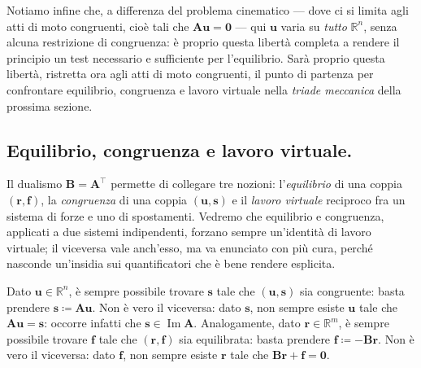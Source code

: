 Notiamo infine che, a differenza del problema cinematico ---
dove ci si limita agli atti di moto congruenti, cioè tali che
$\bm A\bm u=\bm 0$ --- qui $\bm u$ varia su \emph{tutto}
$\mathbb R^n$, senza alcuna restrizione di congruenza: è
proprio questa libertà completa a rendere il principio un test
necessario e sufficiente per l'equilibrio. Sarà proprio questa
libertà, ristretta ora agli atti di moto congruenti, il punto di
partenza per confrontare equilibrio, congruenza e lavoro
virtuale nella \emph{triade meccanica} della prossima sezione.

\subsection{Equilibrio, congruenza e lavoro virtuale.}\label{sec:triade_SCR}
Il dualismo $\bm B=\bm A^\top$ permette di collegare tre
nozioni: l'\emph{equilibrio} di una coppia $(\bm r,\bm f)$, la \emph{congruenza} di una coppia
$(\bm u,\bm s)$ e il \emph{lavoro
	virtuale} reciproco fra un sistema di forze e uno di
spostamenti. Vedremo che equilibrio e congruenza, applicati a
due sistemi indipendenti, forzano sempre un'identità di lavoro
virtuale; il viceversa vale anch'esso, ma va enunciato con più
cura, perché nasconde un'insidia sui quantificatori che è bene
rendere esplicita.
\begin{oss}
	Dato $\bm u\in\mathbb R^n$, è sempre possibile trovare
	$\bm s$ tale che $(\bm u,\bm s)$ sia congruente: basta
	prendere $\bm s\coloneqq\bm A\bm u$. Non è vero il
	viceversa: dato $\bm s$, non sempre esiste $\bm u$ tale che
	$\bm A\bm u=\bm s$: occorre infatti che $\bm s\in\operatorname{Im}\bm
	A$. Analogamente, dato $\bm r\in\mathbb R^m$, è sempre
	possibile trovare $\bm f$ tale che $(\bm r,\bm f)$ sia
	equilibrata: basta prendere $\bm f\coloneqq-\bm B\bm r$.
	Non è vero il viceversa: dato $\bm f$, non sempre esiste
	$\bm r$ tale che $\bm B\bm r+\bm f=\bm 0$.
\end{oss}


